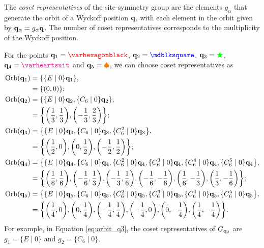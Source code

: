 \begin{definition} \label{def:cosetrep_wyckoff}
The \textit{coset representatives} of the site-symmetry group are the elements \( g_\alpha \) that generate the orbit of a Wyckoff position \( {\vb{q}} \), with each element in the orbit given by \( {\vb{q}}_\alpha = g_\alpha {\vb{q}} \). The number of coset representatives corresponds to the multiplicity of the Wyckoff position.
\end{definition}

\begin{example} \label{ex:coset_representatives_q1q2q3q4q5}
For the points $\q_1 = \textcolor{red}{\varhexagonblack}$, $\q_2 = \textcolor{blue}{\mdblksquare}$, ${\vb{q}}_3 = \textcolor{green}{\bigstar}$, $\q_4 = \textcolor{magenta}{\varheartsuit}$ and ${\vb{q}}_5 = \textcolor{orange}{\spadesuit}$, we can choose coset representatives as
\begin{align}
\text{Orb}({\vb{q}}_1) &= \qty{\{E\mid 0\} {\vb{q}}_1}, \nonumber \\
                 &= \qty{\qty(0,0)}; \label{eq:orbit_q1} \\
\text{Orb}({\vb{q}}_2) &= \qty{\{E\mid 0\} {\vb{q}}_2, \{C_6\mid 0\} {\vb{q}}_2}, \label{eq:orbit_q2} \nonumber \\
                 &= \qty{\qty(\frac{1}{3},\frac{1}{3}),\qty(-\frac{1}{3},\frac{2}{3})}; \\
\text{Orb}({\vb{q}}_3) &= \qty{\{E\mid 0\} {\vb{q}}_3, \{C_6\mid 0\} {\vb{q}}_3, \{C_6^2\mid 0\} {\vb{q}}_3}, \label{eq:orbit_q3} \nonumber \\
                 &= \qty{\qty(\frac{1}{2},0),\qty(0,\frac{1}{2}),\qty(-\frac{1}{2},\frac{1}{2})}; \\
\text{Orb}({\vb{q}}_4) &= \qty{\{E\mid 0\} {\vb{q}}_4, \{C_6\mid 0\} {\vb{q}}_4, \{C_6^2\mid 0\} {\vb{q}}_4, \{C_6^3\mid 0\} {\vb{q}}_4, \{C_6^4\mid 0\} {\vb{q}}_4, \{C_6^5\mid 0\} {\vb{q}}_4}, \label{eq:orbit_q4} \nonumber \\
                 &= \qty{\qty(\frac{1}{6},\frac{1}{6}),\qty(-\frac{1}{6},\frac{1}{3}),\qty(-\frac{1}{3},\frac{1}{6}),\qty(-\frac{1}{6},-\frac{1}{6}),\qty(\frac{1}{6},-\frac{1}{3}),\qty(\frac{1}{3},-\frac{1}{6})}; \\
\text{Orb}({\vb{q}}_5) &= \qty{\{E\mid 0\} {\vb{q}}_5, \{C_6\mid 0\} {\vb{q}}_5, \{C_6^2\mid 0\} {\vb{q}}_5, \{C_6^3\mid 0\} {\vb{q}}_5, \{C_6^4\mid 0\} {\vb{q}}_5, \{C_6^5\mid 0\} {\vb{q}}_5}, \label{eq:orbit_q5} \nonumber \\
                 &= \qty{\qty(\frac{1}{4},0),\qty(0,\frac{1}{4}),\qty(-\frac{1}{4},\frac{1}{4}),\qty(-\frac{1}{4},0),\qty(0,-\frac{1}{4}),\qty(\frac{1}{4},-\frac{1}{4})}.
\end{align}
For example, in Equation \ref{eq:orbit_q3}, the coset representatives of $G_{{\vb{q}}_2}$ are $g_1 = \{E\mid 0\}$ and $g_2 = \{C_6\mid 0\}$.
\end{example}

